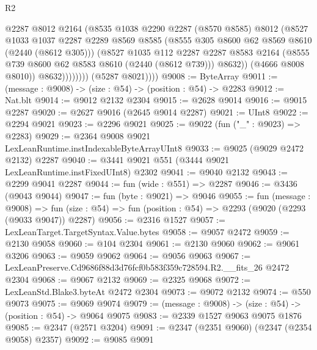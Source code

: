 \begin{lexlean}{R2}
\begin{coremodule}
                          @2287
                          @8012
                          @2164
                          (@8535
                            @1038
                            @2290
                            @2287
                            (@8570 @8585)
                            @8012
                            (@8527
                              @1033
                              @1037
                              @2287
                              @2289
                              @8569
                              @8585
                              (@8555 @305 @8600 @62 @8569 @8610 (@2440 (@8612 @305)))
                              (@8527
                                @1035
                                @112
                                @2287
                                @2287
                                @8583
                                @2164
                                (@8555 @739 @8600 @62 @8583 @8610 (@2440 (@8612 @739)))
                                @8632))
                            (@4666 @8008 @8010))
                          @8632))))))))
          (@5287 @8021))))
@9008 := ByteArray
@9011 := (message : @9008) -> (size : @54) -> (position : @54) -> @2283
@9012 := Nat.blt
@9014 := @9012 @2132 @2304
@9015 := @2628 @9014
@9016 := @9015 @2287
@9020 := @2627 @9016 (@2645 @9014 @2287)
@9021 := UInt8
@9022 := @2294 @9021
@9023 := @2296 @9021
@9025 := @9022 (fun ("_" : @9023) => @2283)
@9029 := @2364 @9008 @9021 LexLeanRuntime.instIndexableByteArrayUInt8
@9033 := @9025 (@9029 @2472 @2132) @2287
@9040 := @3441 @9021 @551 (@3444 @9021 LexLeanRuntime.instFixedUInt8) @2302
@9041 := @9040 @2132
@9043 := @2299 @9041 @2287
@9044 := fun (wide : @551) => @2287
@9046 := @3436 (@9043 @9044)
@9047 := fun (byte : @9021) => @9046
@9055 := fun (message : @9008) =>
  fun (size : @54) => fun (position : @54) => @2293 (@9020 (@2293 (@9033 @9047)) @2287)
@9056 := @2316 @1527
@9057 := LexLeanTarget.TargetSyntax.Value.bytes
@9058 := @9057 @2472
@9059 := @2130 @9058
@9060 := @104 @2304
@9061 := @2130 @9060
@9062 := @9061 @3206
@9063 := @9059 @9062
@9064 := @9056 @9063
@9067 := LexLeanPreserve.Cd9686f88d3d76fcf0b583f359c728594.R2.__fits_26 @2472 @2304
@9068 := @9067 @2132
@9069 := @2325 @9068
@9072 := LexLeanStd.Blake3.byteAt @2472 @2304
@9073 := @9072 @2132
@9074 := @550 @9073
@9075 := @9069 @9074
@9079 := (message : @9008) -> (size : @54) -> (position : @54) -> @9064 @9075
@9083 := @2339 @1527 @9063 @9075 @1876
@9085 := @2347 (@2571 @3204)
@9091 := @2347 (@2351 @9060) (@2347 (@2354 @9058) @2357)
@9092 := @9085 @9091

\end{coremodule}
\end{lexlean}
